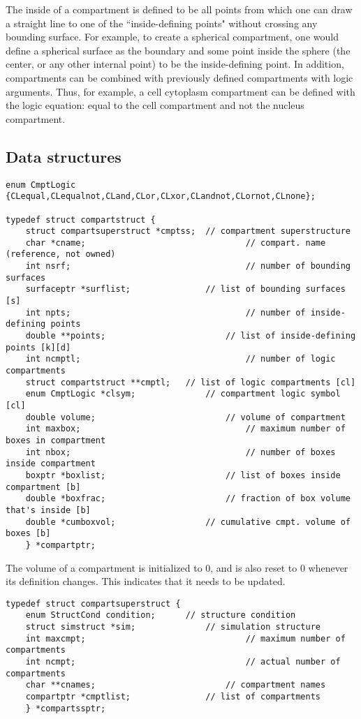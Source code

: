 \documentclass {book}
\begin{document}
The inside of a compartment is defined to be all points from which one can draw a straight line to one of the ``inside-defining points" without crossing any bounding surface. For example, to create a spherical compartment, one would define a spherical surface as the boundary and some point inside the sphere (the center, or any other internal point) to be the inside-defining point. In addition, compartments can be combined with previously defined compartments with logic arguments. Thus, for example, a cell cytoplasm compartment can be defined with the logic equation: equal to the cell compartment and not the nucleus compartment.

\subsection*{Data structures}

\begin{lstlisting}
enum CmptLogic {CLequal,CLequalnot,CLand,CLor,CLxor,CLandnot,CLornot,CLnone};

typedef struct compartstruct {
	struct compartsuperstruct *cmptss;	// compartment superstructure
	char *cname;								// compart. name (reference, not owned)
	int nsrf;									// number of bounding surfaces
	surfaceptr *surflist;				// list of bounding surfaces [s]
	int npts;									// number of inside-defining points
	double **points;						// list of inside-defining points [k][d]
	int ncmptl;									// number of logic compartments
	struct compartstruct **cmptl;	// list of logic compartments [cl]
	enum CmptLogic *clsym;				// compartment logic symbol [cl]
	double volume;							// volume of compartment
	int maxbox;									// maximum number of boxes in compartment
	int nbox;									// number of boxes inside compartment
	boxptr *boxlist;						// list of boxes inside compartment [b]
	double *boxfrac;						// fraction of box volume that's inside [b]
	double *cumboxvol;					// cumulative cmpt. volume of boxes [b]
	} *compartptr;
\end{lstlisting}

The volume of a compartment is initialized to 0, and is also reset to 0 whenever its definition changes. This indicates that it needs to be updated.

\begin{lstlisting}
typedef struct compartsuperstruct {
	enum StructCond condition;		// structure condition
	struct simstruct *sim;				// simulation structure
	int maxcmpt;								// maximum number of compartments
	int ncmpt;									// actual number of compartments
	char **cnames;							// compartment names
	compartptr *cmptlist;				// list of compartments
	} *compartssptr;
\end{lstlisting}
\end{document}
